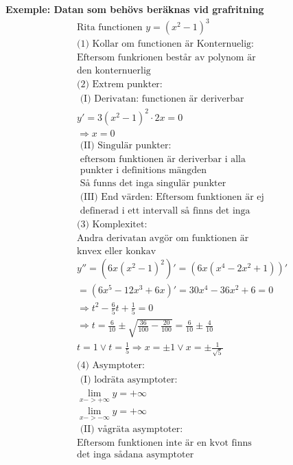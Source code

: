 \begin{multicols}{2}
  \textbf{Exemple: Datan som behövs beräknas vid grafritning}
  \begin{align*}
    &\text{Rita functionen } y={(x^2-1)}^3 \\
    &\text{(1) Kollar om functionen är Konternuelig:} \\
    &\text{Eftersom funkrionen består av polynom är} \\
    &\text{den konternuerlig}   \\
    &\text{(2) Extrem punkter: }   \\
    &\text{ (I) Derivatan: functionen är deriverbar } \\
    &y'=3{(x^2-1)}^2 \cdot 2x=0 \\
    &\Rightarrow x=0  \\
    &\text{ (II) Singulär punkter:} \\
    &\text{ eftersom funktionen är deriverbar i alla} \\
    &\text{ punkter i definitions mängden } \\
    &\text{ Så funns det inga singulär punkter} \\
    &\text{ (III) End värden: Eftersom funktionen är ej} \\
    &\text{ definerad i ett intervall så finns det inga} \\
    &\text{(3) Komplexitet: } \\
    &\text{Andra derivatan avgör om funktionen är} \\
    &\text{knvex eller konkav} \\
    &y''=(6x{(x^2-1)}^2)'= (6x{(x^4-2x^2+1)})' \\
    & = (6x^5-12x^3+6x)' = 30x^4-36x^2+6 = 0 \\
    &\Rightarrow t^2-\frac{6}{5}t+\frac{1}{5}=0 \\
    &\Rightarrow t=\frac{6}{10}\pm
    \sqrt{\frac{36}{100}-\frac{20}{100}} = \frac{6}{10} \pm \frac{4}{10}  \\
    &t=1 \lor t=\frac{1}{5} \Rightarrow x=\pm1 \lor x=\pm\frac{1}{\sqrt{5}}  \\
    &\text{(4) Asymptoter: } \\
    &\text{ (I) lodräta asymptoter: }  \\
    &\lim_{x->+\infty}y=+\infty \\
    &\lim_{x->-\infty}y=+\infty \\
    &\text{ (II) vågräta asymptoter:} \\
    &\text{Eftersom funktionen inte är en kvot finns} \\
    &\text{det inga sådana asymptoter }  \\
  \end{align*}
\end{multicols}
\raggedcolumns


